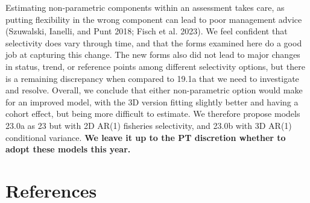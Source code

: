 \documentclass[
]{article}
\begin{document}
Estimating non-parametric components within an assessment takes care, as
putting flexibility in the wrong component can lead to poor management
advice (Szuwalski, Ianelli, and Punt 2018; Fisch et al. 2023). We feel
confident that selectivity does vary through time, and that the forms
examined here do a good job at capturing this change. The new forms also
did not lead to major changes in status, trend, or reference points
among different selectivity options, but there is a remaining
discrepancy when compared to 19.1a that we need to investigate and
resolve. Overall, we conclude that either non-parametric option would
make for an improved model, with the 3D version fitting slightly better
and having a cohort effect, but being more difficult to estimate. We
therefore propose models 23.0a as 23 but with 2D AR(1) fisheries
selectivity, and 23.0b with 3D AR(1) conditional variance. \textbf{We
leave it up to the PT discretion whether to adopt these models this
year.}

\hypertarget{references}{%
\section*{References}\label{references}}
\end{document}
